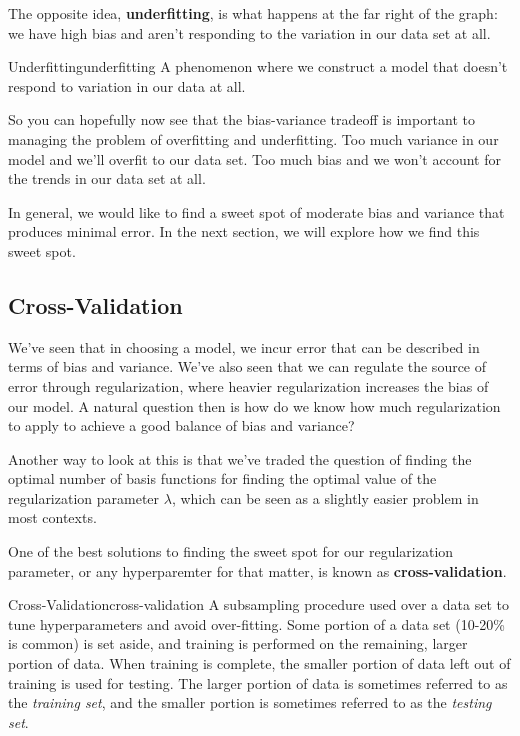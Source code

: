 The opposite idea, \textbf{underfitting}, is what happens at the far right of the graph: we have high bias and aren't responding to the variation in our data set at all.

\begin{definition}{Underfitting}{underfitting}
    A phenomenon where we construct a model that doesn't respond to variation in our data at all.
\end{definition}

So you can hopefully now see that the bias-variance tradeoff is important to managing the problem of overfitting and underfitting. Too much variance in our model and we'll overfit to our data set. Too much bias and we won't account for the trends in our data set at all.

In general, we would like to find a sweet spot of moderate bias and variance that produces minimal error. In the next section, we will explore how we find this sweet spot.

\subsection{Cross-Validation}
We've seen that in choosing a model, we incur error that can be described in terms of bias and variance. We've also seen that we can regulate the source of error through regularization, where heavier regularization increases the bias of our model. A natural question then is how do we know how much regularization to apply to achieve a good balance of bias and variance?

Another way to look at this is that we've traded the question of finding the optimal number of basis functions for finding the optimal value of the regularization parameter $\lambda$, which can be seen as a slightly easier problem in most contexts.

One of the best solutions to finding the sweet spot for our regularization parameter, or any hyperparemter for that matter, is known as \textbf{cross-validation}.

\begin{definition}{Cross-Validation}{cross-validation}
    A subsampling procedure used over a data set to tune hyperparameters and avoid over-fitting. Some portion of a data set (10-20\% is common) is set aside, and training is performed on the remaining, larger portion of data. When training is complete, the smaller portion of data left out of training is used for testing. The larger portion of data is sometimes referred to as the \textit{training set}, and the smaller portion is sometimes referred to as the \textit{testing set}.
\end{definition}

